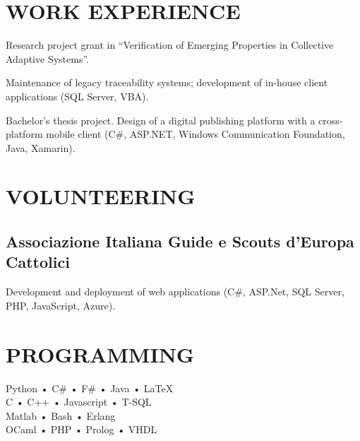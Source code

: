 \documentclass[a4paper]{deedy-resume-openfont}
\begin{document}
\begin{minipage}[t]{0.3\textwidth} 

\section{WORK EXPERIENCE} 

\vspace{\topsep} %
Research project grant in ``Verification of Emerging Properties in Collective Adaptive Systems''.
\sectionsep%

\vspace{\topsep} %
Maintenance of legacy traceability systems; development of in-house client applications (SQL Server, VBA).
\sectionsep%

\vspace{\topsep} %
Bachelor's thesis project.
Design of a digital publishing platform with a cross-platform mobile client (C\#, ASP.NET, Windows Communication Foundation, Java, Xamarin).
\sectionsep%

\section{VOLUNTEERING}

\subsection{Associazione Italiana Guide e Scouts d'Europa Cattolici}
\vspace{\topsep} %
Development and deployment of web applications
(C\#, ASP.Net, SQL Server, PHP, JavaScript, Azure).
\sectionsep%

\section{PROGRAMMING}
Python • C\# • F\# • Java • \LaTeX{}\\
C • C++ • Javascript • T-SQL\\ Matlab • Bash • Erlang \\
OCaml • PHP • Prolog • VHDL
\sectionsep%


\end{minipage}
\end{document}
